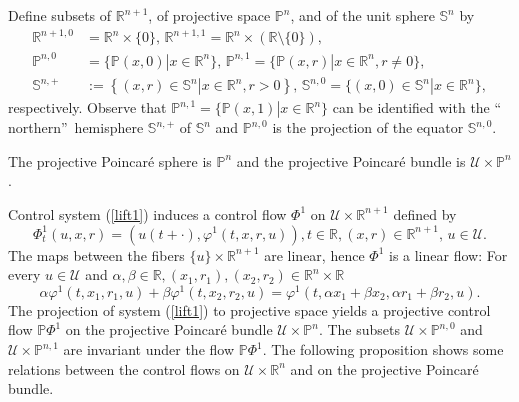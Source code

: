 \documentclass{siamltex}%
\begin{document}
Define subsets of $\mathbb{R}^{n+1}$, of projective space $\mathbb{P}^{n}$,
and of the unit sphere $\mathbb{S}^{n}$ by%
\begin{align}
\mathbb{R}^{n+1,0}  &  =\mathbb{R}^{n}\times\{0\},\,\mathbb{R}^{n+1,1}%
=\mathbb{R}^{n}\times(\mathbb{R}\setminus\{0\}),\nonumber\\
\mathbb{P}^{n,0}  &  =\{\mathbb{P}(x,0)\left\vert x\in\mathbb{R}^{n}\right.
\},\,\mathbb{P}^{n,1}=\{\mathbb{P}(x,r)\left\vert x\in\mathbb{R}^{n}%
,r\not =0\right.  \},\label{4.2}\\
\mathbb{S}^{n,+}  &  :=\left\{  (x,r)\in\mathbb{S}^{n}\left\vert
x\in\mathbb{R}^{n},r>0\right.  \right\}  ,\,\mathbb{S}^{n,0}=\{(x,0)\in
\mathbb{S}^{n}\left\vert x\in\mathbb{R}^{n}\right.  \},\nonumber
\end{align}
respectively. Observe that $\mathbb{P}^{n,1}=\{\mathbb{P}(x,1)\left\vert
x\in\mathbb{R}^{n}\right.  \}$ can be identified with the \textquotedblleft
northern\textquotedblright\ hemisphere $\mathbb{S}^{n,+}$ of $\mathbb{S}^{n}$
and $\mathbb{P}^{n,0}$ is the projection of the equator $\mathbb{S}^{n,0}$.

\begin{definition}
The projective Poincar\'{e} sphere is $\mathbb{P}^{n}$ and the projective
Poincar\'{e} bundle is $\mathcal{U}\times\mathbb{P}^{n}$.
\end{definition}

Control system (\ref{lift1}) induces a control flow $\Phi^{1}$ on
$\mathcal{U}\times\mathbb{R}^{n+1}$ defined by%
\begin{equation}
\Phi_{t}^{1}(u,x,r)=(u(t+\cdot),\varphi^{1}(t,x,r,u)),t\in\mathbb{R}%
,(x,r)\mathbb{\in R}^{n+1},\,u\in\mathcal{U}. \label{Fi_1}%
\end{equation}
The maps between the fibers $\{u\}\times\mathbb{R}^{n+1}$ are linear, hence
$\Phi^{1}$ is a linear flow: For every $u\in\mathcal{U}$ and $\alpha,\beta
\in\mathbb{R},(x_{1},r_{1}),(x_{2},r_{2})\in\mathbb{R}^{n}\times\mathbb{R}$
\[
\alpha\varphi^{1}(t,x_{1},r_{1},u)+\beta\varphi^{1}(t,x_{2},r_{2}%
,u)=\varphi^{1}(t,\alpha x_{1}+\beta x_{2},\alpha r_{1}+\beta r_{2},u).
\]
The projection of system (\ref{lift1}) to projective space yields a projective
control flow $\mathbb{P}\Phi^{1}$ on the projective Poincar\'{e} bundle
$\mathcal{U}\times\mathbb{P}^{n}$. The subsets $\mathcal{U}\times
\mathbb{P}^{n,0}$ and $\mathcal{U}\times\mathbb{P}^{n,1}$ are invariant under
the flow $\mathbb{P}\Phi^{1}$. The following proposition shows some relations
between the control flows on $\mathcal{U}\times\mathbb{R}^{n}$ and on the
projective Poincar\'{e} bundle.
\end{document}
